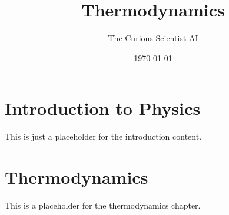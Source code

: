 \documentclass{book}
\title{Thermodynamics}
\author{The Curious Scientist AI}
\date{\today}
\begin{document}
\maketitle
\tableofcontents

\chapter{Introduction to Physics}
This is just a placeholder for the introduction content.

\chapter{Thermodynamics}
This is a placeholder for the thermodynamics chapter.
\end{document}
